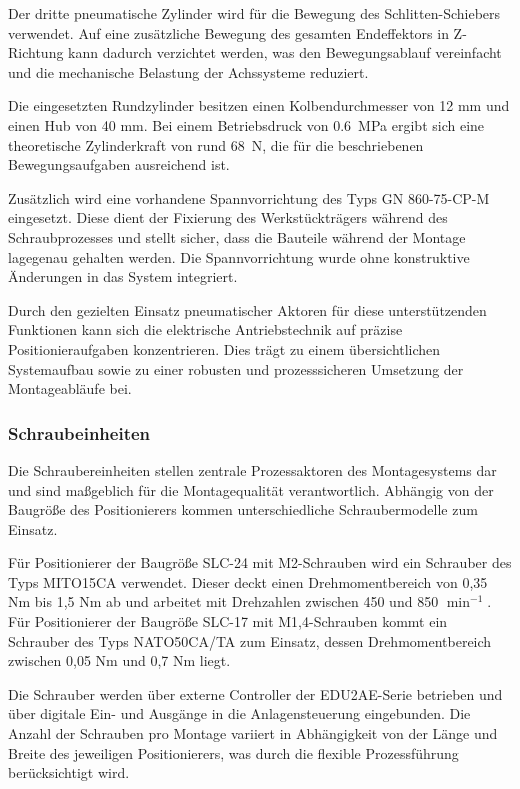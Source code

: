 Der dritte pneumatische Zylinder wird für die Bewegung des Schlitten-Schiebers verwendet. Auf eine zusätzliche Bewegung des gesamten Endeﬀektors in Z-Richtung kann dadurch verzichtet werden, was den Bewegungsablauf vereinfacht und die mechanische Belastung der Achssysteme reduziert.

Die eingesetzten Rundzylinder besitzen einen Kolbendurchmesser von 12 mm und einen Hub von 40 mm. Bei einem Betriebsdruck von \qty{0,6}{\mega\pascal} ergibt sich eine theoretische Zylinderkraft von rund \qty{68}{\newton}, die für die beschriebenen Bewegungsaufgaben ausreichend ist.\cite{ds_festo_dsnu}

Zusätzlich wird eine vorhandene Spannvorrichtung des Typs GN 860-75-CP-M eingesetzt. Diese dient der Fixierung des Werkstückträgers während des Schraubprozesses und stellt sicher, dass die Bauteile während der Montage lagegenau gehalten werden. Die Spannvorrichtung wurde ohne konstruktive Änderungen in das System integriert.\cite{ds_gn860}

Durch den gezielten Einsatz pneumatischer Aktoren für diese unterstützenden Funktionen kann sich die elektrische Antriebstechnik auf präzise Positionieraufgaben konzentrieren. Dies trägt zu einem übersichtlichen Systemaufbau sowie zu einer robusten und prozesssicheren Umsetzung der Montageabläufe bei.

\subsubsection{Schraubeinheiten}
Die Schraubereinheiten stellen zentrale Prozessaktoren des Montagesystems dar und sind maßgeblich für die Montagequalität verantwortlich. Abhängig von der Baugröße des Positionierers kommen unterschiedliche Schraubermodelle zum Einsatz.

Für Positionierer der Baugröße SLC-24 mit M2-Schrauben wird ein Schrauber des Typs MITO15CA verwendet. Dieser deckt einen Drehmomentbereich von 0,35 Nm bis 1,5 Nm ab und arbeitet mit Drehzahlen zwischen 450 und 850 $\min^{-1}$. Für Positionierer der Baugröße SLC-17 mit M1,4-Schrauben kommt ein Schrauber des Typs NATO50CA/TA zum Einsatz, dessen Drehmomentbereich zwischen 0,05 Nm und 0,7 Nm liegt.\cite{ds_kolver_nato50ca, ds_kolver_mito15ca}

Die Schrauber werden über externe Controller der EDU2AE-Serie betrieben und über digitale Ein- und Ausgänge in die Anlagensteuerung eingebunden. Die Anzahl der Schrauben pro Montage variiert in Abhängigkeit von der Länge und Breite des jeweiligen Positionierers, was durch die flexible Prozessführung berücksichtigt wird.\cite{ds_kolver_edu2ae}

